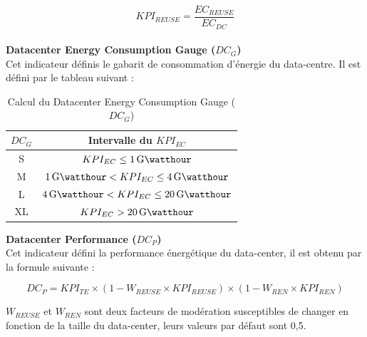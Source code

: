\[KPI_{REUSE} = \frac{EC_{REUSE}}{EC_{DC}}\]\\

\textbf{Datacenter Energy Consumption Gauge ($DC_G$)}\\
Cet indicateur définis le gabarit de consommation d'énergie du data-centre. Il est défini par le tableau suivant :

\begin{table}[h]
	\begin{center}
		\setlength{\tabcolsep}{2em}
		\def\arraystretch{1.25}
		\begin{tabular}{|c|c|}
			\hline
			$DC_G$ & Intervalle du $KPI_{EC}$ \\
			\hline
			S & $KPI_{EC} \leq \SI{1}{\giga\watthour}$ \\
			\hline
			M &  $\SI{1}{\giga\watthour} < KPI_{EC} \leq \SI{4}{\giga\watthour}$ \\
			\hline
			L & $\SI{4}{\giga\watthour} < KPI_{EC} \leq \SI{20}{\giga\watthour}$ \\
			\hline
			XL & $KPI_{EC} > \SI{20}{\giga\watthour}$\\
			\hline
		\end{tabular}
		\caption{Calcul du Datacenter Energy Consumption Gauge ($DC_G$)}
	\end{center}
\end{table}

\textbf{Datacenter Performance ($DC_P$)}\\
Cet indicateur défini la performance énergétique du data-center, il est obtenu par la formule suivante :

\[DC_P = KPI_{TE} \times (1 - W_{REUSE} \times KPI_{REUSE}) \times (1 - W_{REN} \times KPI_{REN})\]

$W_{REUSE}$ et $W_{REN}$ sont deux facteurs de modération susceptibles de changer en fonction de la taille du data-center, leurs valeurs par défaut sont 0,5. \\

